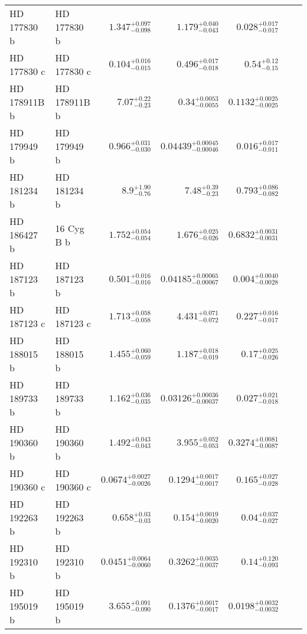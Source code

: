 \begin{longtable*}{llrrrrr}
HD 177830 b & HD 177830 b & $1.347^{+0.097}_{-0.098}$ & $1.179^{+0.040}_{-0.043}$ & $0.028^{+0.017}_{-0.017}$ & \cite{Vogt00} & \\
HD 177830 c & HD 177830 c & $0.104^{+0.016}_{-0.015}$ & $0.496^{+0.017}_{-0.018}$ & $0.54^{+0.12}_{-0.15}$ & \cite{Meschiari11} & \\
HD 178911B b & HD 178911B b & $7.07^{+0.22}_{-0.23}$ & $0.34^{+0.0053}_{-0.0055}$ & $0.1132^{+0.0025}_{-0.0025}$ & \cite{Zucker02} & \\
HD 179949 b & HD 179949 b & $0.966^{+0.031}_{-0.030}$ & $0.04439^{+0.00045}_{-0.00046}$ & $0.016^{+0.017}_{-0.011}$ & \cite{Tiney01} & \\
HD 181234 b & HD 181234 b & $8.9^{+1.90}_{-0.76}$ & $7.48^{+0.39}_{-0.23}$ & $0.793^{+0.086}_{-0.082}$ & \cite{Rickman19} & \\
HD 186427 b & 16 Cyg B b & $1.752^{+0.054}_{-0.054}$ & $1.676^{+0.025}_{-0.026}$ & $0.6832^{+0.0031}_{-0.0031}$ & \cite{Chochran97} & \\
HD 187123 b & HD 187123 b & $0.501^{+0.016}_{-0.016}$ & $0.04185^{+0.00065}_{-0.00067}$ & $0.004^{+0.0040}_{-0.0028}$ & \cite{Butler98} & \\
HD 187123 c & HD 187123 c & $1.713^{+0.058}_{-0.058}$ & $4.431^{+0.071}_{-0.072}$ & $0.227^{+0.016}_{-0.017}$ & \cite{Wright09} & \\
HD 188015 b & HD 188015 b & $1.455^{+0.060}_{-0.059}$ & $1.187^{+0.018}_{-0.019}$ & $0.17^{+0.025}_{-0.026}$ & \cite{Marcy05} & \\
HD 189733 b & HD 189733 b & $1.162^{+0.036}_{-0.035}$ & $0.03126^{+0.00036}_{-0.00037}$ & $0.027^{+0.021}_{-0.018}$ & \cite{Bouchy05} & \\
HD 190360 b & HD 190360 b & $1.492^{+0.043}_{-0.043}$ & $3.955^{+0.052}_{-0.053}$ & $0.3274^{+0.0081}_{-0.0087}$ & \cite{Naef03} & \\
HD 190360 c & HD 190360 c & $0.0674^{+0.0027}_{-0.0026}$ & $0.1294^{+0.0017}_{-0.0017}$ & $0.165^{+0.027}_{-0.028}$ & \cite{Vogt05} & \\
HD 192263 b & HD 192263 b & $0.658^{+0.03}_{-0.03}$ & $0.154^{+0.0019}_{-0.0020}$ & $0.04^{+0.037}_{-0.027}$ & \cite{Santos00} & \\
HD 192310 b & HD 192310 b & $0.0451^{+0.0064}_{-0.0060}$ & $0.3262^{+0.0035}_{-0.0037}$ & $0.14^{+0.120}_{-0.093}$ & \cite{Howard11} & \\
HD 195019 b & HD 195019 b & $3.655^{+0.091}_{-0.090}$ & $0.1376^{+0.0017}_{-0.0017}$ & $0.0198^{+0.0032}_{-0.0032}$ & \cite{Fischer99} & \\

\end{longtable*}
